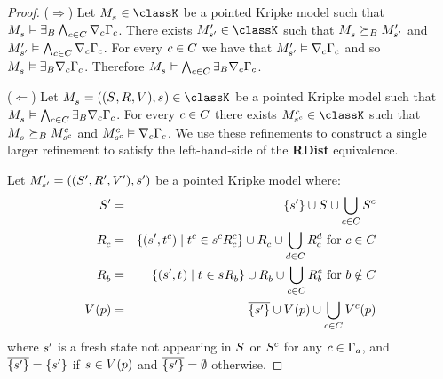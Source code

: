 \begin{proof}
($\Rightarrow$) Let $\kPModel{\kStateS} \in \classK$ be a pointed Kripke model such that $\kPModel{\kStateS} \entails \somerefsBs \bigwedge_{\agentC \in \agentsC} \coversC \Gamma_\agentC$.
There exists $\kPModelP{\kStateSP} \in \classK$ such that $\kPModel{\kStateS} \simulatesBs \kPModelP{\kStateSP}$ and $\kPModelP{\kStateSP} \entails \bigwedge_{\agentC \in \agentsC} \coversC \Gamma_\agentC$.
For every $\agentC \in \agentsC$ we have that $\kPModelP{\kStateSP} \entails \coversC \Gamma_\agentC$ and so $\kPModel{\kStateS} \entails \somerefsBs \coversC \Gamma_\agentC$.
Therefore $\kPModel{\kStateS} \entails \bigwedge_{\agentC \in \agentsC} \somerefsBs \coversC \Gamma_\agentC$.

($\Leftarrow$) Let $\kPModelAndTuple{\kStateS} \in \classK$ be a pointed Kripke model such that $\kPModel{\kStateS} \entails \bigwedge_{\agentC \in \agentsC} \somerefsBs \coversC \Gamma_\agentC$.
For every $\agentC \in \agentsC$ there exists $\kPModel[\agentC]{\kStateS[\agentC]} \in \classK$ such that $\kPModel{\kStateS} \simulatesBs \kPModel[\agentC]{\kStateS[\agentC]}$ and $\kPModel[\agentC]{\kStateS[\agentC]} \entails \coversC \Gamma_\agentC$.
We use these refinements to construct a single larger refinement to satisfy the left-hand-side of the {\bf RDist} equivalence.

Let $\kPModelAndTupleP{\kStateSP}$ be a pointed Kripke model where:
\begin{eqnarray*}
    \kStatesP &=& \{\kStateSP\} \cup \kStates \cup \bigcup_{\agentC \in \agentsC} \kStates[\agentC]\\
    \kAccessibilityC &=& \{(\kStateSP, \kStateT[\agentC]) \mid \kStateT[\agentC] \in \kSuccessorsC[\agentC]{\kStateS[\agentC]}\} \cup \kAccessibilityC \cup \bigcup_{\agentD \in \agentsC} \kAccessibilityC[\agentD] \text{ for } \agentC \in \agentsC\\
    \kAccessibilityB &=& \{(\kStateSP, \kStateT) \mid \kStateT \in \kSuccessorsB{\kStateS}\} \cup \kAccessibilityB \cup \bigcup_{\agentC \in \agentsC} \kAccessibilityB[\agentC] \text{ for } \agentB \notin \agentsC\\
    \kValuation(\atomP) &=& \overline{\{\kStateSP\}} \cup \kValuation(\atomP) \cup \bigcup_{\agentC \in \agentsC} \kValuation[\agentC](\atomP)
\end{eqnarray*}
where $\kStateSP$ is a fresh state not appearing in $\kStates$ or $\kStates[\agentC]$ for any $\agentC \in \Gamma_\agentA$, and $\overline{\{\kStateSP\}} = \{\kStateSP\}$ if $\kStateS \in \kValuation(\atomP)$ and $\overline{\{\kStateSP\}} = \emptyset$ otherwise.


\end{proof}
